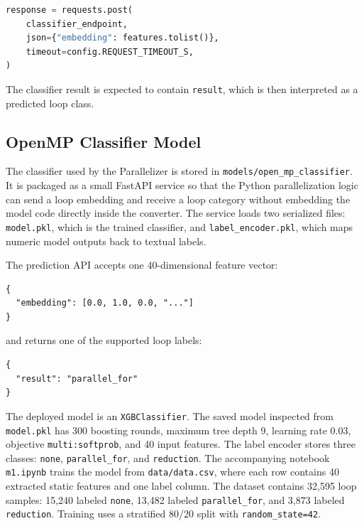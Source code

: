 \documentclass[11pt,a4paper]{article}
\newcommand{\modulepath}[1]{\texttt{#1}}
\begin{document}
\begin{lstlisting}[language=Python]
response = requests.post(
    classifier_endpoint,
    json={"embedding": features.tolist()},
    timeout=config.REQUEST_TIMEOUT_S,
)
\end{lstlisting}

The classifier result is expected to contain \texttt{result}, which is then
interpreted as a predicted loop class.

\subsection{OpenMP Classifier Model}

The classifier used by the Parallelizer is stored in
\modulepath{models/open\_mp\_classifier}. It is packaged as a small FastAPI
service so that the Python parallelization logic can send a loop embedding and
receive a loop category without embedding the model code directly inside the
converter. The service loads two serialized files: \texttt{model.pkl}, which is
the trained classifier, and \texttt{label\_encoder.pkl}, which maps numeric
model outputs back to textual labels.

The prediction API accepts one 40-dimensional feature vector:

\begin{lstlisting}
{
  "embedding": [0.0, 1.0, 0.0, "..."]
}
\end{lstlisting}

and returns one of the supported loop labels:

\begin{lstlisting}
{
  "result": "parallel_for"
}
\end{lstlisting}

The deployed model is an \texttt{XGBClassifier}. The saved model inspected from
\texttt{model.pkl} has 300 boosting rounds, maximum tree depth 9, learning rate
0.03, objective \texttt{multi:softprob}, and 40 input features. The label
encoder stores three classes: \texttt{none}, \texttt{parallel\_for}, and
\texttt{reduction}. The accompanying notebook \texttt{m1.ipynb} trains the model
from \modulepath{data/data.csv}, where each row contains 40 extracted static
features and one label column. The dataset contains 32,595 loop samples:
15,240 labeled \texttt{none}, 13,482 labeled \texttt{parallel\_for}, and 3,873
labeled \texttt{reduction}. Training uses a stratified 80/20 split with
\texttt{random\_state=42}.
\end{document}
